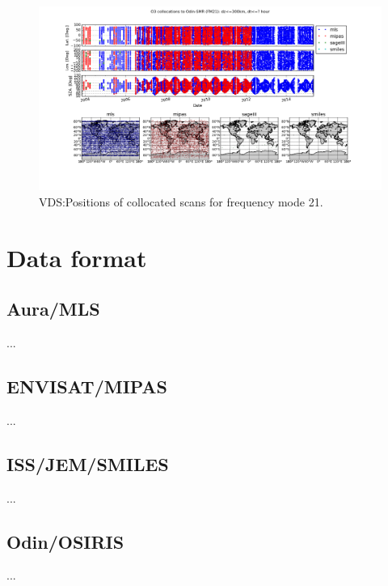 \begin{figure}[t]
\centering
\includegraphics[width=17cm]{test_collocation_fm21.png}
\caption{VDS:Positions of collocated scans for frequency mode 21.}
\label{fig:vdsfm21}
\end{figure}



\section{Data format}
\subsection{Aura/MLS}
...

\subsection{ENVISAT/MIPAS}
...

\subsection{ISS/JEM/SMILES}
...

\subsection{Odin/OSIRIS}
...


